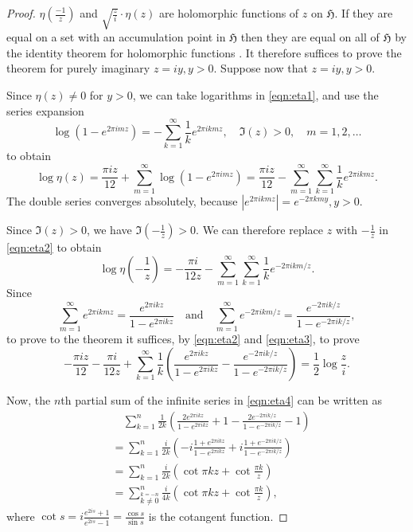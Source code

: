 \documentclass{article}
\begin{document}
\begin{proof}
$\eta(\frac{-1}{z})$ and $\sqrt{\frac{z}{i}} \cdot \eta(z)$ are holomorphic functions of $z$ on $\mathfrak{H}$. If they are equal on a set with an accumulation point in $\mathfrak{H}$ then they are equal on all of $\mathfrak{H}$ by the identity theorem for holomorphic functions \cite[Chapter III, Theorem 1.2]{MR1659317}.
It therefore suffices to prove the theorem for purely imaginary $z=iy, y>0$. Suppose now that $z=iy,y>0$. 

Since $\eta(z) \neq 0$ for $y>0$, we can take logarithms in \eqref{eqn:eta1}, and use the series expansion
\[
\log(1-e^{2\pi imz})=-\sum_{k=1}^\infty \frac{1}{k}e^{2\pi ikmz}, \quad \Im(z)>0, \quad m=1,2,\ldots
\]
to obtain
\begin{equation}
\label{eqn:eta2}
\log \eta(z)=\frac{\pi iz}{12}+\sum_{m=1}^\infty \log(1-e^{2\pi imz})=\frac{\pi iz}{12}-\sum_{m=1}^\infty \sum_{k=1}^\infty \frac{1}{k} e^{2\pi ikmz}.
\end{equation}
The double series converges absolutely, because $|e^{2\pi ikmz}|=e^{-2\pi kmy}, y>0$.

Since $\Im(z)>0$, we have $\Im(-\frac{1}{z})>0$. We can therefore replace $z$ with $-\frac{1}{z}$ in \eqref{eqn:eta2} to obtain
\begin{equation}
\label{eqn:eta3}
\log \eta(-\frac{1}{z})=-\frac{\pi i}{12z}-\sum_{m=1}^\infty \sum_{k=1}^\infty \frac{1}{k} e^{-2\pi ikm/z}.
\end{equation}
Since
\[
\sum_{m=1}^\infty e^{2\pi ikmz}=\frac{e^{2\pi ikz}}{1-e^{2\pi ikz}} \quad \textrm{and} \quad
\sum_{m=1}^\infty e^{-2\pi ikm/z}=\frac{e^{-2\pi ik/z}}{1-e^{-2\pi ik/z}},
\]
to prove to the theorem it suffices, by \eqref{eqn:eta2} and \eqref{eqn:eta3}, to prove
\begin{equation}
\label{eqn:eta4}
-\frac{\pi iz}{12}-\frac{\pi i}{12z}+\sum_{k=1}^\infty \frac{1}{k}(\frac{e^{2\pi ikz}}{1-e^{2\pi ikz}}-\frac{e^{-2\pi ik/z}}{1-e^{-2\pi ik/z}})=\frac{1}{2}\log \frac{z}{i}.
\end{equation}

Now, the $n$th partial sum of the infinite series in \eqref{eqn:eta4} can be written as
\begin{equation}
\label{eqn:cot}
\begin{split}
&\quad \sum_{k=1}^n \frac{1}{2k}(\frac{2e^{2\pi ikz}}{1-e^{2\pi ikz}}+1-\frac{2e^{-2\pi ik/z}}{1-e^{-2\pi ik/z}}-1)\\
&=\sum_{k=1}^n \frac{i}{2k}(-i\frac{1+e^{2\pi ikz}}{1-e^{2\pi ikz}}+i\frac{1+e^{-2\pi ik/z}}{1-e^{-2\pi ik/z}})\\
&=\sum_{k=1}^n \frac{i}{2k}(\cot \pi kz+\cot \frac{\pi k}{z})\\
&=\sum_{\stackrel{k=-n}{k \neq 0}}^n \frac{i}{4k}(\cot \pi kz+\cot \frac{\pi k}{z}),
\end{split}
\end{equation}
where $\cot s=i\frac{e^{2is}+1}{e^{2is}-1}=\frac{\cos s}{\sin s}$ is the cotangent function.


\end{proof}
\end{document}
